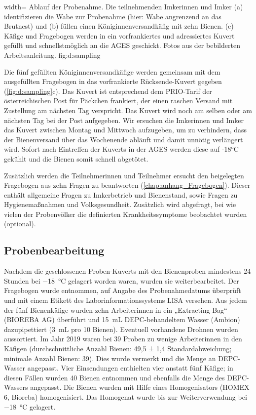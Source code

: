   {width=\textwidth} %
  {Ablauf der Probenahme. Die teilnehmenden Imkerinnen und Imker (a) identifizieren die Wabe zur Probenahme (hier: Wabe angrenzend an das Brutnest) und (b) füllen einen Königinnenversandkäfig mit zehn Bienen. (c) Käfige und Fragebogen werden in ein vorfrankiertes und adressiertes Kuvert gefüllt und schnellstmöglich an die AGES geschickt. Fotos aus der bebilderten Arbeitsanleitung.} %
  {} %
  {fig:d:sampling} %


Die fünf gefüllten Königinnenversandkäfige werden gemeinsam mit dem ausgefüllten Fragebogen in das vorfrankierte Rücksende-Kuvert gegeben (\cref{fig:d:sampling}c). Das Kuvert ist entsprechend dem PRIO-Tarif der österreichischen Post für Päckchen frankiert, der einen raschen Versand mit Zustellung am nächsten Tag verspricht. Das Kuvert wird noch am selben oder am nächsten Tag bei der Post aufgegeben. Wir ersuchen die Imkerinnen und Imker das Kuvert zwischen Montag und Mittwoch aufzugeben, um zu verhindern, dass der Bienenversand über das Wochenende abläuft und damit unnötig verlängert wird. Sofort nach Eintreffen der Kuverts in der AGES werden diese auf -18°C gekühlt und die Bienen somit schnell abgetötet.

Zusätzlich werden die Teilnehmerinnen und Teilnehmer ersucht den beigelegten Fragebogen aus zehn Fragen zu beantworten (\cref{chap:anhang_Fragebogen}). Dieser enthält allgemeine Fragen zu Imkerbetrieb und Bienenstand, sowie Fragen zu Hygienemaßnahmen und Volksgesundheit. Zusätzlich wird abgefragt, bei wie vielen der Probenvölker die definierten Krankheitssymptome beobachtet wurden (optional).


\subsection{Probenbearbeitung} \label{chap:probenbearbeitung}

Nachdem die geschlossenen Proben-Kuverts mit den Bienenproben mindestens 24 Stunden bei \SI{-18}{\degreeCelsius} gelagert worden waren, wurden sie weiterbearbeitet. Der Fragebogen wurde entnommen, auf Angabe des Probenahmedatums überprüft und mit einem Etikett des Laborinformationssystems LISA versehen. Aus jedem der fünf Bienenkäfige wurden zehn Arbeiterinnen in ein „Extracting Bag“ (BIOREBA AG) überführt und \SI{15}{\milli\liter} DEPC-behandeltem Wasser (Ambion) dazupipettiert (\SI{3}{\milli\liter} pro 10 Bienen). Eventuell vorhandene Drohnen wurden aussortiert. Im Jahr 2019 waren bei 39 Proben zu wenige Arbeiterinnen in den Käfigen (durchschnittliche Anzahl Bienen: 49,5 ± 1,4 Standardabweichung; minimale Anzahl Bienen: 39). Dies wurde vermerkt und die Menge an DEPC-Wasser angepasst. Vier Einsendungen enthielten vier anstatt fünf Käfige; in diesen Fällen wurden 40 Bienen entnommen und ebenfalls die Menge des DEPC-Wassers angepasst. Die Bienen wurden mit Hilfe eines Homogenisators (HOMEX 6, Bioreba) homogenisiert. Das Homogenat wurde bis zur Weiterverwendung bei \SI{-18}{\degreeCelsius} gelagert.

